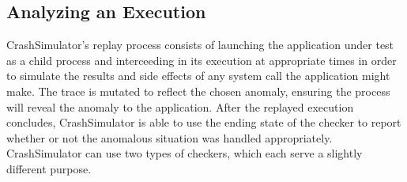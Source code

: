 

    \subsection{Analyzing an Execution}

    CrashSimulator's replay process consists of launching the
    application under test as a child process and interceeding in its execution
    at appropriate times in order to simulate the results and side effects of any
    system call the application might make.
    The trace is mutated to reflect the chosen anomaly, ensuring the process
    will reveal the anomaly to the application.
    After the replayed execution
    concludes, CrashSimulator is able to use the ending state of the checker to
    report whether or not the anomalous situation was handled appropriately.
    CrashSimulator
    can use two types of checkers, which each serve a slightly different purpose.



